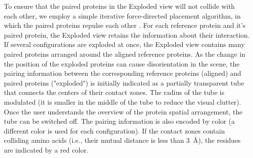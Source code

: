 \documentclass{bmcart}
\def\ExpView {Exploded view\xspace}
\begin{document}
To ensure that the paired proteins in the Exploded view will not collide with each other, we employ a simple iterative force-directed placement algorithm, in which the paired proteins repulse each other \cite{fruchterman1991graph}.
For each reference protein and it's paired protein, the \ExpView retains the information about their interaction.
If several configurations are exploded at once, the \ExpView contains many paired proteins arranged around the aligned reference proteins.
As the change in the position of the exploded proteins can cause disorientation in the scene, the pairing information between the corresponding reference proteins (aligned) and paired proteins ("exploded") is initially indicated as a partially transparent tube that connects the centers of their contact zones.
The radius of the tube is modulated (it is smaller in the middle of the tube to reduce the visual clutter).
Once the user understands the overview of the protein spatial arrangement, the tube can be switched off.
The pairing information is also encoded by color (a different color is used for each configuration).
If the contact zones contain colliding amino acids (i.e., their mutual distance is less than 3~\AA), the residues are indicated by a red color.
\end{document}
